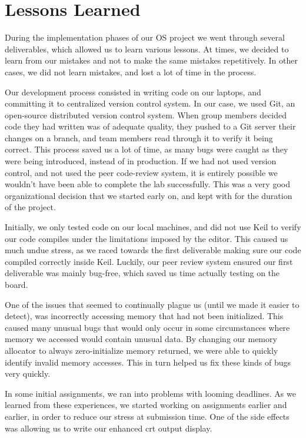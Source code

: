 \documentclass[12pt]{report}
\begin{document}
\part{Lessons Learned}

    During the implementation phases of our OS project we went through several
    deliverables, which allowed us to learn various lessons. At times, we
    decided to learn from our mistakes and not to make the same mistakes
    repetitively. In other cases, we did not learn mistakes, and lost a lot of
    time in the process.

    Our development process consisted in writing code on our laptops, and
    committing it to centralized version control system. In our case, we used
    Git, an open-source distributed version control system. When group members
    decided code they had written was of adequate quality, they pushed to a Git
    server their changes on a branch, and team members read through it to verify
    it being correct. This process saved us a lot of time, as many bugs were
    caught as they were being introduced, instead of in production. If we had
    not used version control, and not used the peer code-review system, it is
    entirely possible we wouldn't have been able to complete the lab
    successfully. This was a very good organizational decision that we started
    early on, and kept with for the duration of the project.

    Initially, we only tested code on our local machines, and did not use Keil
    to verify our code compiles under the limitations imposed by the editor.
    This caused us much undue stress, as we raced towards the first deliverable
    making sure our code compiled correctly inside Keil. Luckily, our peer
    review system ensured our first deliverable was mainly bug-free, which saved
    us time actually testing on the board.

    One of the issues that seemed to continually plague us (until we made it
    easier to detect), was incorrectly accessing memory that had not been
    initialized. This caused many unusual bugs that would only occur in some
    circumstances where memory we accessed would contain unusual data. By
    changing our memory allocator to always zero-initialize memory returned, we
    were able to quickly identify invalid memory accesses. This in turn helped
    us fix these kinds of bugs very quickly.

    In some initial assignments, we ran into problems with looming deadlines. As
    we learned from these experiences, we started working on assignments earlier
    and earlier, in order to reduce our stress at submission time. One of the
    side effects was allowing us to write our enhanced crt output display.
\end{document}
